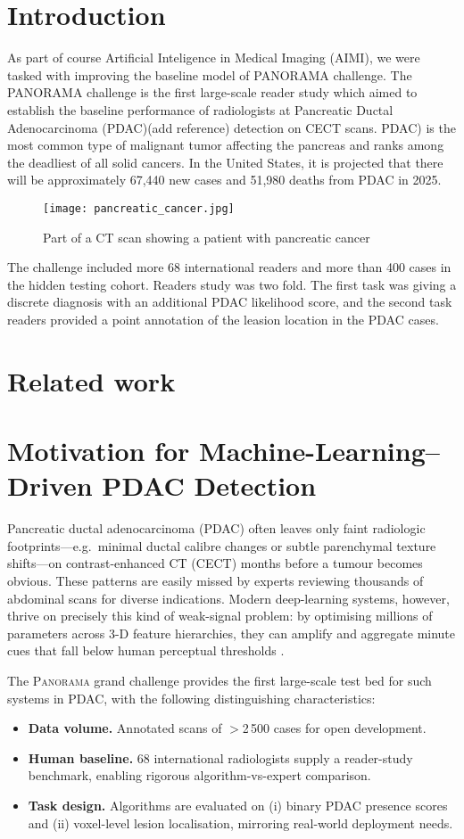 \documentclass[conference]{IEEEtran}
\begin{document}
\section{Introduction}
As part of course Artificial Inteligence in Medical Imaging (AIMI)\cite{b4}, we were tasked with improving the baseline model of \textsc{PANORAMA}\cite{b5} challenge. The PANORAMA challenge is the first large-scale reader study which aimed to establish the baseline performance of radiologists at Pancreatic Ductal Adenocarcinoma (PDAC)(add reference) detection on CECT scans. PDAC) is the most common type of malignant tumor affecting the pancreas and ranks among the deadliest of all solid cancers. In the United States, it is projected that there will be approximately 67,440 new cases and 51,980 deaths from PDAC in 2025\cite{b2}.
\begin{figure}
    \centering
    \texttt{[image: pancreatic\_cancer.jpg]}
    \caption{Part of a CT scan showing a patient with pancreatic cancer\cite{b6}}
    \label{fig:ct_scan}
\end{figure}
The challenge included more  68 international readers and more than 400 cases in the hidden testing cohort. Readers study was two fold. The first task was giving a discrete diagnosis with an additional PDAC likelihood score, and the second task readers provided a point annotation of the leasion location in the PDAC cases.

\section{Related work}
\section{Motivation for Machine-Learning–Driven PDAC Detection}
Pancreatic ductal adenocarcinoma (PDAC) often leaves only faint radiologic footprints—e.g.\ minimal ductal calibre changes or subtle parenchymal texture shifts—on contrast-enhanced CT (CECT) months before a tumour becomes obvious.  These patterns are easily missed by experts reviewing thousands of abdominal scans for diverse indications.  Modern deep-learning systems, however, thrive on precisely this kind of weak-signal problem: by optimising millions of parameters across 3-D feature hierarchies, they can amplify and aggregate minute cues that fall below human perceptual thresholds \cite{Esteva2017,McKinney2020}.

The \textsc{Panorama} grand challenge provides the first large-scale test bed for such systems in PDAC, with the following distinguishing characteristics:  
\begin{itemize}[leftmargin=*]
  \item \textbf{Data volume.}  Annotated scans of $>$2\,500 cases for open development.
  \item \textbf{Human baseline.} 68 international radiologists supply a reader-study benchmark, enabling rigorous algorithm-vs-expert comparison.
  \item \textbf{Task design.}  Algorithms are evaluated on (i) binary PDAC presence scores and (ii) voxel-level lesion localisation, mirroring real-world deployment needs.
\end{itemize}
\end{document}
